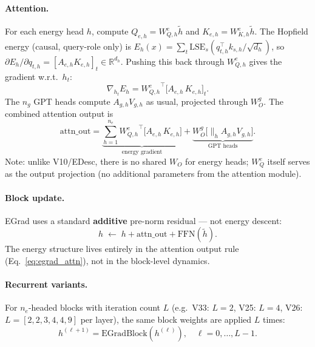 \documentclass[11pt,a4paper]{article}
\begin{document}
\paragraph{Attention.}
For each energy head $h$, compute $Q_{e,h} = W_{Q,h}^e \tilde{h}$ and
$K_{e,h} = W_{K,h}^e \tilde{h}$.
The Hopfield energy (causal, query-role only) is
$E_h(x) = \sum_t \mathrm{LSE}_s(q_{t,h}^\top k_{s,h}/\sqrt{d_h})$,
so $\partial E_h / \partial q_{t,h} = [A_{e,h} K_{e,h}]_t \in \mathbb{R}^{d_h}$.
Pushing this back through $W_{Q,h}^e$ gives the gradient w.r.t.\ $h_t$:
\begin{equation}
  \nabla_{h_t} E_h = {W_{Q,h}^{e}}^\top \bigl[A_{e,h}\, K_{e,h}\bigr]_t.
  \label{eq:egrad_head}
\end{equation}
The $n_g$ GPT heads compute $A_{g,h} V_{g,h}$ as usual, projected through $W_O^g$.
The combined attention output is
\begin{equation}
  \mathrm{attn\_out} = \underbrace{\sum_{h=1}^{n_e} {W_{Q,h}^{e}}^\top
    \bigl[A_{e,h}\, K_{e,h}\bigr]}_{\text{energy gradient}}
  + \underbrace{W_O^g \bigl[\|_h A_{g,h} V_{g,h}\bigr]}_{\text{GPT heads}}.
  \label{eq:egrad_attn}
\end{equation}
Note: unlike V10/EDesc, there is no shared $W_O$ for energy heads; $W_Q^e$ itself serves
as the output projection (no additional parameters from the attention module).

\paragraph{Block update.}
EGrad uses a standard \textbf{additive} pre-norm residual --- not energy descent:
\begin{equation}
  h \;\leftarrow\; h + \mathrm{attn\_out} + \mathrm{FFN}(\tilde{h}).
  \label{eq:egrad_block}
\end{equation}
The energy structure lives entirely in the attention output rule
(Eq.~\ref{eq:egrad_attn}), not in the block-level dynamics.

\paragraph{Recurrent variants.}
For $n_e$-headed blocks with iteration count $L$ (e.g.\ V33: $L=2$, V25: $L=4$,
V26: $L=[2,2,3,4,4,9]$ per layer), the same block weights are applied $L$ times:
\begin{equation}
  h^{(\ell+1)} = \mathrm{EGradBlock}(h^{(\ell)}), \quad \ell = 0, \ldots, L-1.
  \label{eq:egrad_recur}
\end{equation}
\end{document}
